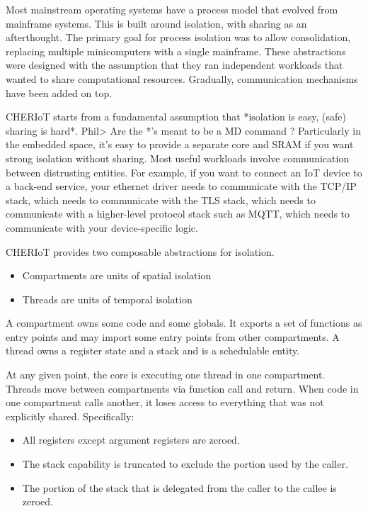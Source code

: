 Most mainstream operating systems have a process model that evolved from mainframe systems.
This is built around isolation, with sharing as an afterthought.
The primary goal for process isolation was to allow consolidation, replacing multiple minicomputers with a single mainframe.
These abstractions were designed with the assumption that they ran independent workloads that wanted to share computational resources.
Gradually, communication mechanisms have been added on top.

CHERIoT starts from a fundamental assumption that *isolation is easy, (safe) sharing is hard*.
Phil> Are the *'s meant to be a MD command ?
Particularly in the embedded space, it's easy to provide a separate core and SRAM if you want strong isolation without sharing.
Most useful workloads involve communication between distrusting entities.
For example, if you want to connect an IoT device to a back-end service, your ethernet driver needs to communicate with the TCP/IP stack, which needs to communicate with the TLS stack, which needs to communicate with a higher-level protocol stack such as MQTT, which needs to communicate with your device-specific logic.

CHERIoT provides two composable abstractions for isolation.

\begin{itemize}
	\item{Compartments are units of spatial isolation}
	\item{Threads are units of temporal isolation}
\end{itemize}

A compartment owns some code and some globals.
It exports a set of functions as entry points and may import some entry points from other compartments.
A thread owns a register state and a stack and is a schedulable entity.

At any given point, the core is executing one thread in one compartment.
Threads move between compartments via function call and return.
When code in one compartment calls another, it loses access to everything that was not explicitly shared.
Specifically:

\begin{itemize}
	\item{All registers except argument registers are zeroed.}
	\item{The stack capability is truncated to exclude the portion used by the caller.}
	\item{The portion of the stack that is delegated from the caller to the callee is zeroed.}
\end{itemize}

